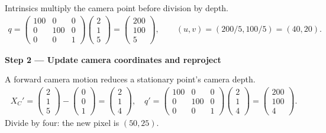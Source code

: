 \documentclass[letterpaper,11pt,english,openany,oneside]{jupyterBook}
\begin{document}
\sphinxAtStartPar
{} Intrinsics multiply the camera point before division by depth.
{\color{QuizMathBlue} \begin{equation*}
\begin{split}
q=\begin{pmatrix}100&0&0\\0&100&0\\0&0&1\end{pmatrix}\begin{pmatrix}2\\1\\5\end{pmatrix}=\begin{pmatrix}200\\100\\5\end{pmatrix},\qquad (u,v)=(200/5,100/5)=(40,20).
\end{split}
\end{equation*}}
\par

\par\medskip{}
{\color{QuizStepRed}\bfseries Step 2 — Update camera coordinates and reproject}\par\smallskip

\sphinxAtStartPar
{} A forward camera motion reduces a stationary point’s camera depth.
{\color{QuizMathBlue} \begin{equation*}
\begin{split}
X_C'=\begin{pmatrix}2\\1\\5\end{pmatrix}-\begin{pmatrix}0\\0\\1\end{pmatrix}=\begin{pmatrix}2\\1\\4\end{pmatrix},\quad q'=\begin{pmatrix}100&0&0\\0&100&0\\0&0&1\end{pmatrix}\begin{pmatrix}2\\1\\4\end{pmatrix}=\begin{pmatrix}200\\100\\4\end{pmatrix}.
\end{split}
\end{equation*}}
\sphinxAtStartPar
Divide by four: the new pixel is {\color{QuizMathBlue} \((50,25)\)}.
\end{document}
